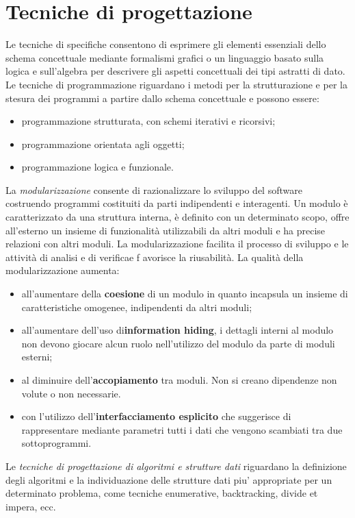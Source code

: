 \documentclass[12pt]{report}
\begin{document}
	\section{Tecniche di progettazione}
	Le tecniche di specifiche consentono di esprimere gli elementi essenziali dello schema concettuale mediante formalismi grafici o un linguaggio basato sulla logica e sull'algebra per descrivere gli aspetti concettuali dei tipi astratti di dato. \\
	Le tecniche di programmazione riguardano i metodi per la strutturazione e per la stesura dei programmi a partire dallo schema concettuale e possono essere:
	\begin{itemize}
		\item programmazione strutturata, con schemi iterativi e ricorsivi;
		\item programmazione orientata agli oggetti;
		\item programmazione logica e funzionale.
	\end{itemize}
	La \textit{modularizzazione} consente di razionalizzare lo sviluppo del software costruendo programmi costituiti da parti indipendenti e interagenti. Un modulo è caratterizzato da una struttura interna, è definito con un determinato scopo, offre all'esterno un insieme di funzionalità utilizzabili da altri moduli e ha precise relazioni con altri moduli. La modularizzazione facilita il processo di sviluppo e le attività di analisi e di verificae f avorisce la riusabilità. La qualità della modularizzazione aumenta:
	\begin{itemize}
		\item all'aumentare della \textbf{coesione} di un modulo in quanto incapsula un insieme di caratteristiche omogenee, indipendenti da altri moduli;
		\item all'aumentare dell'uso di\textbf{information hiding}, i dettagli interni al modulo non devono giocare alcun ruolo nell'utilizzo del modulo da parte di moduli esterni;
		\item al diminuire dell'\textbf{accopiamento} tra moduli. Non si creano dipendenze non volute o non necessarie.
		\item con l'utilizzo dell'\textbf{interfacciamento esplicito} che suggerisce di rappresentare mediante parametri tutti i dati che vengono scambiati tra due sottoprogrammi.
	\end{itemize}
	Le \textit{tecniche di progettazione di algoritmi e strutture dati} riguardano la definizione degli algoritmi e la individuazione delle strutture dati piu' appropriate per un determinato problema, come tecniche enumerative, backtracking, divide et impera, ecc. \\
\end{document}
